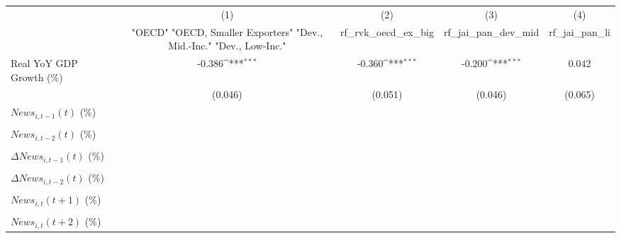 {
\def\sym#1{\ifmmode^{#1}\else\(^{#1}\)\fi}
\begin{tabular}{l*{4}{c}}
\toprule
                    &\multicolumn{1}{c}{(1)}&\multicolumn{1}{c}{(2)}&\multicolumn{1}{c}{(3)}&\multicolumn{1}{c}{(4)}\\
                    &\multicolumn{1}{c}{ "OECD" "OECD, Smaller Exporters" "Dev., Mid.-Inc." "Dev., Low-Inc."}&\multicolumn{1}{c}{rf_rvk_oecd_ex_big}&\multicolumn{1}{c}{rf_jai_pan_dev_mid}&\multicolumn{1}{c}{rf_jai_pan_li}\\
\midrule
Real YoY GDP Growth (\%)&      -0.386\sym{***}&      -0.360\sym{***}&      -0.200\sym{***}&       0.042         \\
                    &     (0.046)         &     (0.051)         &     (0.046)         &     (0.065)         \\
\addlinespace
$ News_{i,t-1}(t)$ (\%)&                     &                     &                     &                     \\
                    &                     &                     &                     &                     \\
\addlinespace
$ News_{i,t-2}(t)$ (\%)&                     &                     &                     &                     \\
                    &                     &                     &                     &                     \\
\addlinespace
$ \Delta News_{i,t-1}(t)$ (\%)&                     &                     &                     &                     \\
                    &                     &                     &                     &                     \\
\addlinespace
$ \Delta News_{i,t-2}(t)$ (\%)&                     &                     &                     &                     \\
                    &                     &                     &                     &                     \\
\addlinespace
$ News_{i,t}(t+1)$ (\%)&                     &                     &                     &                     \\
                    &                     &                     &                     &                     \\
\addlinespace
$ News_{i,t}(t+2)$ (\%)&                     &                     &                     &                     \\

\end{tabular}}
